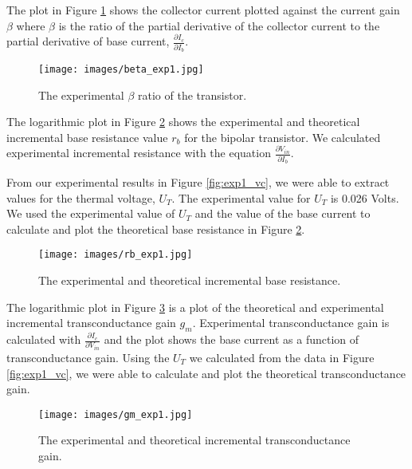 \documentclass{article}
\begin{document}
The plot in Figure \ref{fig:exp1_beta} shows the collector current plotted against the current gain $\beta$ where $\beta$ is the ratio of the partial derivative of the collector current to the partial derivative of base current, $\frac{\partial I_{c}}{\partial I_{b}}$.

\begin{figure}[H]   
  \centering        
  \texttt{[image: images/beta\_exp1.jpg]}
  \caption{The experimental $\beta$ ratio of the transistor.}   
  \label{fig:exp1_beta}
\end{figure}

The logarithmic plot in Figure \ref{fig:exp1_rb} shows the experimental and theoretical incremental base resistance value $r_{b}$ for the bipolar transistor. We calculated experimental incremental resistance with the equation $\frac{\partial V_{in}}{\partial I_{b}}$. 

From our experimental results in Figure \ref{fig:exp1_vc}, we were able to extract values for the thermal voltage, $U_T$. The experimental value for $U_T$ is 0.026 Volts. We used the experimental value of $U_T$ and the value of the base current to calculate and plot the theoretical base resistance in Figure \ref{fig:exp1_rb}.

\begin{figure}[H]   
  \centering        
  \texttt{[image: images/rb\_exp1.jpg]}
  \caption{The experimental and theoretical incremental base resistance.}   
  \label{fig:exp1_rb}
\end{figure}

The logarithmic plot in Figure \ref{fig:exp1_gm} is a plot of the theoretical and experimental incremental transconductance gain $g_{m}$. Experimental transconductance gain is calculated with $\frac{\partial I_{c} }{\partial V_{in}}$ and the plot shows the base current as a function of transconductance gain.  Using the $U_{T}$ we calculated from the data in Figure \ref{fig:exp1_vc}, we were able to calculate and plot the theoretical transconductance gain.

\begin{figure}[H]   
  \centering        
  \texttt{[image: images/gm\_exp1.jpg]}
  \caption{The experimental and theoretical incremental transconductance gain.}   
  \label{fig:exp1_gm}
\end{figure}
\end{document}
